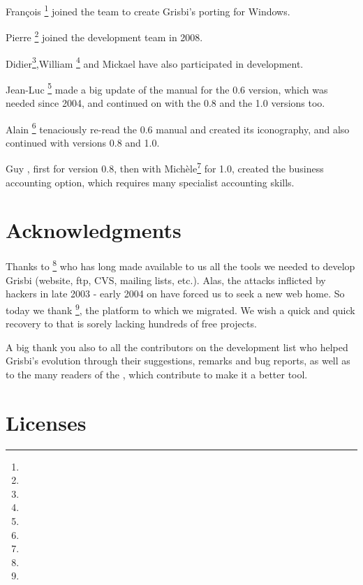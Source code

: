 François \footnote{\urlFrancoisTerrotEmail{}} joined the team to create Grisbi's \gls{porting} for Windows.

{Pierre }\footnote{\urlPierreBiavaEmail{}} joined the development team in 2008.

Didier\footnote{\urlDidierChevalierEmail{}},William \footnote{\urlWilliamOllivierEmail{}} and Mickael  have also participated in development.

{Jean-Luc }\footnote{\urlJeanLucDuflotEmail{}} made a big update of the manual for the 0.6 version, which was needed since 2004, and continued on with the 0.8 and the 1.0 versions too.

Alain \footnote{\urlAlainLetientEmail{}} tenaciously re-read the 0.6 manual and created its iconography, and also continued with versions 0.8 and 1.0.

Guy , first for version 0.8, then with {Michèle}\footnote{\urlMicheleBondilEmail{}} for 1.0, created the business accounting option, which requires many specialist accounting skills.

\section{Acknowledgments \label{introduction-thanks}}

Thanks to \footnote{\urlTuxFamily{}} who has long made available to us all the tools we needed to develop Grisbi 
(website, ftp, CVS, mailing lists, etc.). Alas, the attacks inflicted by hackers in late 2003 - early 2004 on  have forced us to seek a new web home. So today we thank \footnote{\urlSourceForge{}}, the platform to which we migrated.  We wish a quick and quick recovery to  that is sorely lacking hundreds of free projects.

A big thank you also to all the contributors on the development list who helped Grisbi's evolution through their suggestions, remarks and bug reports, as well as to the many readers of the , which contribute to make it a better tool.

\section{Licenses \label{introduction-licenses}}

